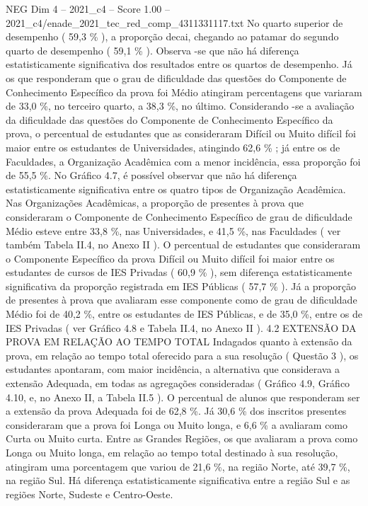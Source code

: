 \begin{textsample}{NEG Dim 4 – 2021\_c4 – Score 1.00 – 2021\_c4/enade\_2021\_tec\_red\_comp\_4311331117.txt}
No quarto superior de desempenho ( 59,3 \% ), a proporção decai, chegando ao patamar do segundo quarto de desempenho ( 59,1 \% ).
Observa -se que não há diferença estatisticamente significativa dos resultados entre os quartos de desempenho.
Já os que responderam que o grau de dificuldade das questões do Componente de Conhecimento Específico da prova foi Médio atingiram percentagens que variaram de 33,0 \%, no terceiro quarto, a 38,3 \%, no último.
Considerando -se a avaliação da dificuldade das questões do Componente de Conhecimento Específico da prova, o percentual de estudantes que as consideraram Difícil ou Muito difícil foi maior entre os estudantes de Universidades, atingindo 62,6 \% ; já entre os de Faculdades, a Organização Acadêmica com a menor incidência, essa proporção foi de 55,5 \%.
No Gráfico 4.7, é possível observar que não há diferença estatisticamente significativa entre os quatro tipos de Organização Acadêmica.
Nas Organizações Acadêmicas, a proporção de presentes à prova que consideraram o Componente de Conhecimento Específico de grau de dificuldade Médio esteve entre 33,8 \%, nas Universidades, e 41,5 \%, nas Faculdades ( ver também Tabela II.4, no Anexo II ).
O percentual de estudantes que consideraram o Componente Específico da prova Difícil ou Muito difícil foi maior entre os estudantes de cursos de IES Privadas ( 60,9 \% ), sem diferença estatisticamente significativa da proporção registrada em IES Públicas ( 57,7 \% ).
Já a proporção de presentes à prova que avaliaram esse componente como de grau de dificuldade Médio foi de 40,2 \%, entre os estudantes de IES Públicas, e de 35,0 \%, entre os de IES Privadas ( ver Gráfico 4.8 e Tabela II.4, no Anexo II ). 4.2 EXTENSÃO DA PROVA EM RELAÇÃO AO TEMPO TOTAL Indagados quanto à extensão da prova, em relação ao tempo total oferecido para a sua resolução ( Questão 3 ), os estudantes apontaram, com maior incidência, a alternativa que considerava a extensão Adequada, em todas as agregações consideradas ( Gráfico 4.9, Gráfico 4.10, e, no Anexo II, a Tabela II.5 ).
O percentual de alunos que responderam ser a extensão da prova Adequada foi de 62,8 \%.
Já 30,6 \% dos inscritos presentes consideraram que a prova foi Longa ou Muito longa, e 6,6 \% a avaliaram como Curta ou Muito curta.
Entre as Grandes Regiões, os que avaliaram a prova como Longa ou Muito longa, em relação ao tempo total destinado à sua resolução, atingiram uma porcentagem que variou de 21,6 \%, na região Norte, até 39,7 \%, na região Sul.
Há diferença estatisticamente significativa entre a região Sul e as regiões Norte, Sudeste e Centro-Oeste.

\end{textsample}
